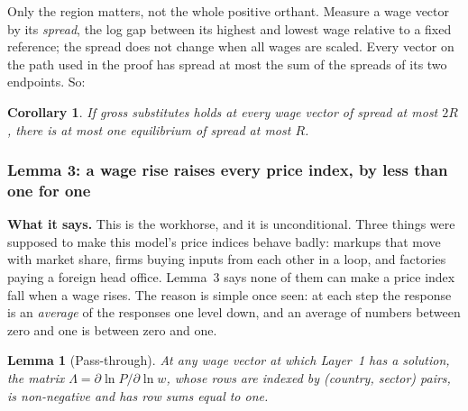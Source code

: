 \documentclass[11pt]{article}
\newcommand{\says}[1]{\smallskip\noindent\textbf{What it says.} #1\smallskip}
\theoremstyle{plain}
\newtheorem{lemma}{Lemma}
\newtheorem{corollary}{Corollary}
\theoremstyle{remark}
\theoremstyle{definition}
\begin{document}
\noindent Only the region matters, not the whole positive orthant. Measure a wage
vector by its \emph{spread}, the log gap between its highest and lowest wage relative
to a fixed reference; the spread does not change when all wages are scaled. Every
vector on the path used in the proof has spread at most the sum of the spreads of its
two endpoints. So:

\begin{corollary}\label{cor:region}
If gross substitutes holds at every wage vector of spread at most $2R$, there is at
most one equilibrium of spread at most $R$.
\end{corollary}

\subsubsection{Lemma 3: a wage rise raises every price index, by less than one for one}

\says{This is the workhorse, and it is unconditional. Three things were supposed to
make this model's price indices behave badly: markups that move with market share,
firms buying inputs from each other in a loop, and factories paying a foreign
head office. Lemma~3 says none of them can make a price index fall when a wage rises.
The reason is simple once seen: at each step the response is an \emph{average} of the
responses one level down, and an average of numbers between zero and one is between
zero and one.}

\begin{lemma}[Pass-through]\label{lem:pass}
At any wage vector at which Layer~1 has a solution, the matrix
$\Lambda=\partial\ln P/\partial\ln w$, whose rows are indexed by (country, sector)
pairs, is non-negative and has row sums equal to one.
\end{lemma}
\end{document}
